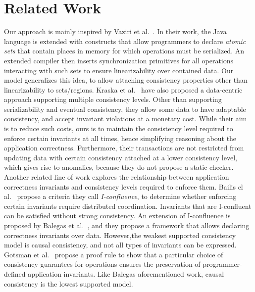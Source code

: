 \documentclass[preprint,numbers]{sigplanconf}
\begin{document}
\section{Related Work}
\label{sec:relatedwork}
Our approach is mainly inspired by Vaziri et al.~\cite{dolby2012data}. In their work, 
the Java language is extended with constructs that allow programmers to declare
\emph{atomic sets} that contain places in memory for which operations must be
serialized. An extended compiler then inserts synchronization primitives for all
operations interacting with such sets to ensure linearizability over contained
data. Our model generalizes this idea, to allow attaching consistency
properties other than linearizability to sets/regions.
Kraska et al.~\cite{kraska2009consistency} have also proposed a data-centric
approach supporting multiple consistency levels. Other than supporting
serializability and eventual consistency, they allow some data to have adaptable consistency, and
accept invariant violations at a monetary cost. While their aim is to reduce
such costs, ours is to maintain the consistency level required to enforce
certain invariants at all times, hence simplifying reasoning about the application
correctness. Furthermore, their transactions are not restricted from updating
data with certain consistency attached at a lower consistency level, which gives
rise to anomalies, because they do not propose a static checker. 
Another related line of work explores the relationship between
application correctness invariants and consistency levels required to enforce them.
Bailis el al.~\cite{bailis2014coordination} propose a criteria they call
\emph{I-confluence}, to determine whether enforcing certain invariants require distributed
coordination. Invariants that are I-confluent can be satisfied without strong
consistency. 
An extension of I-confluence is proposed by Balegas et
al.~\cite{balegas2015putting}, and they propose a framework that allows declaring
correctness invariants over data. However,the weakest supported consistency
model is causal consistency, and not all types of invariants can be
expressed.
Gotsman et al.~\cite{gotsman2016cause} propose a proof rule to show that a 
particular choice of consistency guarantees for operations
ensures the preservation of programmer-defined application invariants. Like
Balegas aforementioned work, causal consistency is the lowest supported model.
\end{document}
